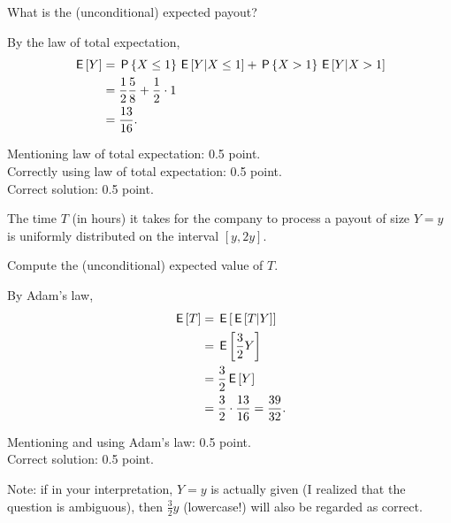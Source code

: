 \begin{exercise}[1.5]
What is the (unconditional) expected payout?
\begin{solution}
By the law of total expectation,
\begin{align}
    \,\mathsf{E}\left[Y\right] &= \,\mathsf{P}\left\{X \leq 1\right\} \,\mathsf{E}\left[Y | X \leq 1\right] + \,\mathsf{P}\left\{X > 1\right\} \,\mathsf{E}\left[Y | X > 1\right] \\
    &= \frac{1}{2} \frac{5}{8} + \frac{1}{2} \cdot 1 \\
    &= \frac{13}{16}.
\end{align}

Mentioning law of total expectation: 0.5 point.\\
Correctly using law of total expectation: 0.5 point.\\
Correct solution: 0.5 point.
\end{solution}
\end{exercise}

The time $T$ (in hours) it takes for the company to process a payout of size $Y=y$ is uniformly distributed on the interval $[y,2y]$.

\begin{exercise}[1]
Compute the (unconditional) expected value of $T$.
\begin{solution}
By Adam's law,
\begin{align}
    \,\mathsf{E}\left[T\right] &= \,\mathsf{E}\left[\,\mathsf{E}\left[T|Y\right]\right] \\
    &= \,\mathsf{E}\left[\frac{3}{2}Y\right] \\
    &= \frac{3}{2}\,\mathsf{E}\left[Y\right] \\
    &= \frac{3}{2} \cdot \frac{13}{16} = \frac{39}{32}.
\end{align}

Mentioning and using Adam's law: 0.5 point.\\
Correct solution: 0.5 point.

Note: if in your interpretation, $Y=y$ is actually given (I realized that the question is ambiguous), then $\frac{3}{2}y$ (lowercase!) will also be regarded as correct.
\end{solution}
\end{exercise}